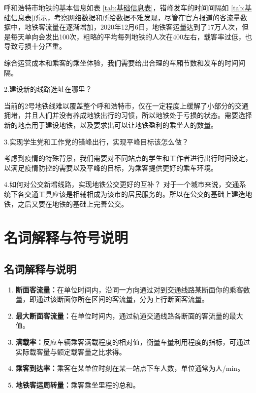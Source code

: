 \documentclass[12pt,a4paper]{mcmthesis}
\newcommand\wordc[1]{\textbf{#1}}
\begin{document}
 呼和浩特市地铁的基本信息如表 \ref{tab:基础信息表}，错峰发车的时间间隔如 \ref{tab:基础信息表}所示，考察网络数据和所给数据不难发现，尽管在官方报道的客流量数据中，地铁客流量在逐渐增加，2020年12月6日，地铁客运量达到了17万人次，但是每天单向会发出100次，粗略的平均每列地铁的人次在400左右，载客率过低，也导致亏损十分严重。

综合运营成本和乘客的乘坐体验，我们需要给出合理的车厢节数和发车的时间间隔。 

{2.建设新的线路选址在哪里？}
  
当前的2号地铁线难以覆盖整个呼和浩特市，仅在一定程度上缓解了小部分的交通拥堵，并且人们并没有养成地铁出行的习惯，所以地铁处于亏损的状态。需要选择新的地点用于建设地铁，以及要求出可以让地铁盈利的乘坐人的数量。
 
  {3.实现学生党和工作党的错峰出行，实现平峰目标该怎么做？}
  
考虑到疫情的特殊背景，我们需要对不同站点的学生和工作者进行出行时间设定，以满足疫情防控的需要以及平峰的目标，为乘客提供更好的乘车环境。
  
  {4.如何对公交新增线路，实现地铁公交更好的互补？}
  对于一个城市来说，交通系统下各交通工具应该是相辅相成为该市的居民服务的。所以在公交的基础上建造地铁，之后又要在地铁的基础上完善公交。




\section{名词解释与符号说明}

\subsection{名词解释与说明}
\begin{enumerate}
	\item \wordc{断面客流量：}在单位时间内，沿同一方向通过对到交通线路某断面你的乘客数量，即通过该断面你所在区间的客流量，分为上行断面客流量。
	
	\item \wordc{最大断面客流量：}在单位时间内，通过轨道交通线路各断面的客流量的最大值。
	
	\item \wordc{满载率：}反应车辆乘客满载程度的相对值，衡量车量利用程度的指标，可通过实际载客量与额定载客量之比求得。
	
	\item \wordc{乘客到达率：}乘客在某单位时刻在某一站点下车人数，单位通常为人/min。
	\item \wordc{地铁客运周转量：}乘客乘坐里程的总和。
	

	
	
\end{enumerate}
\end{document}
